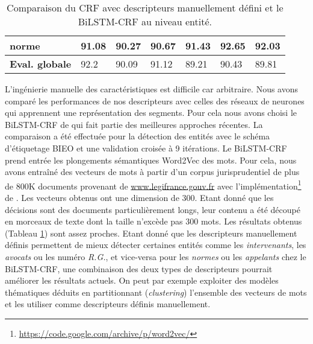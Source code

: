 \begin{table}[!h]
\begin{tabular}{|l|l|l|l|l|l|l|}
		\textbf{norme}         & 91.08              & 90.27                               & 90.67       & 91.43              & 92.65                & 92.03       \\ \hline
		\noalign{\smallskip}\hline\noalign{\smallskip}
		\textbf{Eval. globale} & 92.2               & 90.09                               & 91.12       & 89.21              & 90.43                & 89.81       \\ \hline
	\end{tabular}
	\caption{Comparaison du CRF avec descripteurs manuellement défini et le BiLSTM-CRF au niveau entité.}\label{tab:structuration:perf-bilstmcrf}
\end{table}

L'ingénierie manuelle des caractéristiques est difficile car arbitraire. Nous avons comparé les performances de nos descripteurs avec celles des réseaux de neurones qui apprennent une représentation des segments. Pour cela nous avons choisi le BiLSTM-CRF de \citet{lample2016nnner} qui fait partie des meilleures approches récentes. La comparaison a été effectuée pour la détection des entités avec le schéma d'étiquetage BIEO et une validation croisée à 9 itérations. Le BiLSTM-CRF prend entrée les plongements sémantiques Word2Vec des mots. Pour cela, nous avons entraîné des vecteurs de mots à partir d'un corpus jurisprudentiel de plus de 800K documents provenant de \url{www.legifrance.gouv.fr} avec l'implémentation\footnote{\url{https://code.google.com/archive/p/word2vec/}} de \citet{lemikolov2014word2vec}. Les vecteurs obtenus ont une dimension de 300. Etant donné que les décisions sont des documents particulièrement longs, leur contenu a été découpé en morceaux de texte dont la taille n'excède pas 300 mots. Les résultats obtenus (Tableau \ref{tab:structuration:perf-bilstmcrf}) sont assez proches. Etant donné que les descripteurs manuellement définis permettent de mieux détecter certaines entités comme les \textit{intervenants}, les \textit{avocats} ou les numéro \textit{R.G.}, et vice-versa pour les \textit{normes} ou les \textit{appelants} chez le BiLSTM-CRF, une combinaison des deux types de descripteurs pourrait améliorer les résultats actuels. On peut par exemple exploiter des modèles thématiques déduits en partitionnant (\textit{clustering}) l'ensemble des vecteurs de mots  et les utiliser comme descripteurs définis manuellement. 
 

